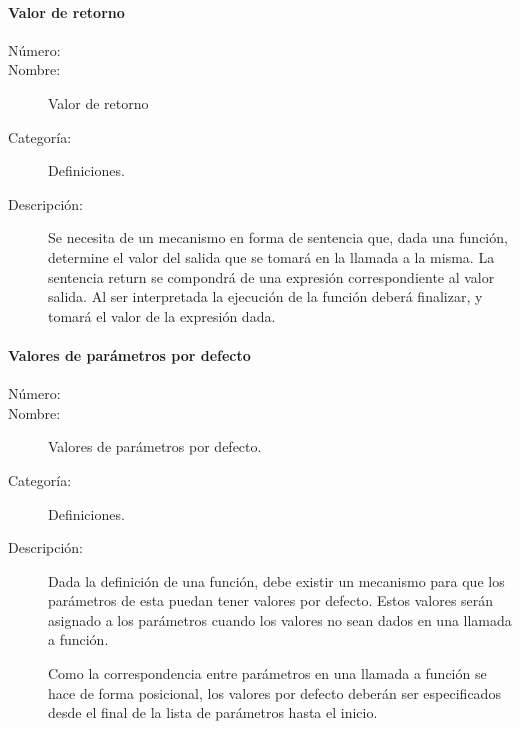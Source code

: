 \paragraph{Valor de retorno}
	\begin{description}
		\item [Número:] \cn
		\item [Nombre:] Valor de retorno
		\item [Categoría:] Definiciones.
		\item [Descripción:] Se necesita de un mecanismo en forma de sentencia que, dada una función, determine
		el valor del salida que se tomará en la llamada a la misma. La sentencia return se compondrá de una 
		expresión correspondiente al valor salida. Al ser interpretada la ejecución de
		la función deberá finalizar, y tomará el valor de la expresión dada.
	\end{description}

\paragraph{Valores de parámetros por defecto}
	\begin{description}
		\item [Número:] \cn
		\item [Nombre:] Valores de parámetros por defecto.
		\item [Categoría:] Definiciones.
		\item [Descripción:] Dada la definición de una función, debe existir un mecanismo para que los parámetros de esta puedan tener 
		valores por defecto. Estos valores serán asignado a los parámetros cuando los valores no sean dados en una llamada a función. 
		
		Como la correspondencia entre parámetros en una llamada a función se hace de forma posicional, los valores por defecto deberán ser especificados 
		desde el final de la lista de parámetros hasta el inicio.
	\end{description}

